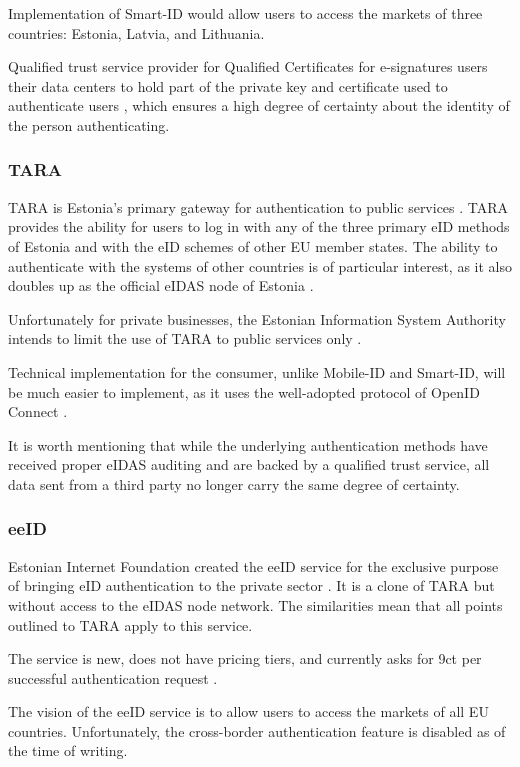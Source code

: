 Implementation of Smart-ID would allow users to access the markets of three countries: Estonia, Latvia, and Lithuania.

Qualified trust service provider for Qualified Certificates for e-signatures users their data centers to hold part of the private key and certificate used to authenticate users \cite{eu-trustservices}, which ensures a high degree of certainty about the identity of the person authenticating.

\subsubsection{TARA}

TARA is Estonia's primary gateway for authentication to public services \cite{tara}. TARA provides the ability for users to log in with any of the three primary eID methods of Estonia and with the eID schemes of other EU member states. The ability to authenticate with the systems of other countries is of particular interest, as it also doubles up as the official eIDAS node of Estonia \cite{tara}.

Unfortunately for private businesses, the Estonian Information System Authority intends to limit the use of TARA to public services only \cite{tara-business}.

Technical implementation for the consumer, unlike Mobile-ID and Smart-ID, will be much easier to implement, as it uses the well-adopted protocol of OpenID Connect \cite{tara-technical, oidc}.

It is worth mentioning that while the underlying authentication methods have received proper eIDAS auditing and are backed by a qualified trust service, all data sent from a third party no longer carry the same degree of certainty.

\subsubsection{eeID}

Estonian Internet Foundation created the eeID service for the exclusive purpose of bringing eID authentication to the private sector \cite{eeid}. It is a clone of TARA but without access to the eIDAS node network. The similarities mean that all points outlined to TARA apply to this service.

The service is new, does not have pricing tiers, and currently asks for 9ct per successful authentication request \cite{eeid-pricing}.

The vision of the eeID service is to allow users to access the markets of all EU countries. Unfortunately, the cross-border authentication feature is disabled as of the time of writing.

